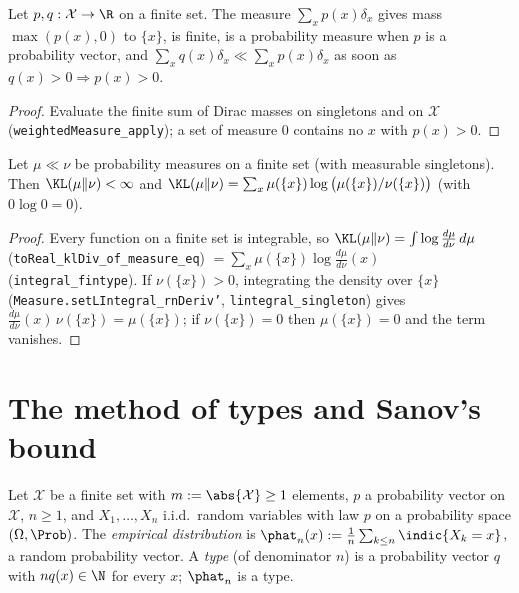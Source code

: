 \begin{lemma}\label{lem:pconc_weighted_measure}
\leanok
Let $p, q : \mathcal X \to \R$ on a finite set. The measure $\sum_x p(x)\delta_x$ gives mass
$\max(p(x), 0)$ to $\{x\}$, is finite, is a probability measure when $p$ is a probability vector,
and $\sum_x q(x)\delta_x \ll \sum_x p(x)\delta_x$ as soon as $q(x) > 0 \Rightarrow p(x) > 0$.
\end{lemma}

\begin{proof}
\leanok
Evaluate the finite sum of Dirac masses on singletons and on $\mathcal X$
(\texttt{weightedMeasure\_apply}); a set of measure $0$ contains no $x$ with $p(x) > 0$.
\end{proof}

\begin{lemma}\label{lem:pconc_kl_finite_sum}
\leanok
Let $\mu \ll \nu$ be probability measures on a finite set (with measurable singletons). Then
$\KL(\mu \| \nu) < \infty$ and $\KL(\mu \| \nu) = \sum_x \mu(\{x\}) \log\big(\mu(\{x\})/\nu(\{x\})\big)$
(with $0 \log 0 = 0$).
\end{lemma}

\begin{proof}
\leanok
Every function on a finite set is integrable, so $\KL(\mu\|\nu) = \int \log\frac{d\mu}{d\nu}\,d\mu$
(\texttt{toReal\_klDiv\_of\_measure\_eq}) $= \sum_x \mu(\{x\}) \log\frac{d\mu}{d\nu}(x)$
(\texttt{integral\_fintype}). If $\nu(\{x\}) > 0$, integrating the density over $\{x\}$
(\texttt{Measure.setLIntegral\_rnDeriv'}, \texttt{lintegral\_singleton}) gives
$\frac{d\mu}{d\nu}(x)\,\nu(\{x\}) = \mu(\{x\})$; if $\nu(\{x\}) = 0$ then $\mu(\{x\}) = 0$ and the term
vanishes.
\end{proof}

\section{The method of types and Sanov's bound}
\label{sec:pconc_sanov}

Let $\mathcal X$ be a finite set with $m := \abs{\mathcal X} \ge 1$ elements, $p$ a probability
vector on $\mathcal X$, $n \ge 1$, and $X_1, \dots, X_n$ i.i.d.\ random variables with law $p$ on
a probability space $(\Omega, \Prob)$. The \emph{empirical distribution} is
$\phat_n(x) := \frac1n \sum_{k \le n} \indic\{X_k = x\}$, a random probability vector. A
\emph{type} (of denominator $n$) is a probability vector $q$ with $n q(x) \in \N$ for every $x$;
$\phat_n$ is a type.

